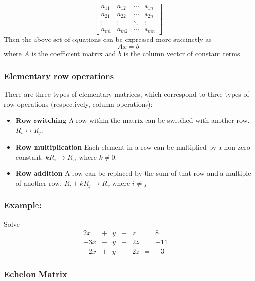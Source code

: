 \documentclass[11pt]{article}
\providecommand{\tightlist}{%
      \setlength{\itemsep}{0pt}\setlength{\parskip}{0pt}}
\begin{document}
\[
\begin{bmatrix}
a_{11} & a_{12} & \cdots & a_{1n} \\
a_{21} & a_{22} &\cdots & a_{2n} \\
\vdots & \vdots & \ddots & \vdots \\
a_{m1} & a_{m2} & \cdots & a_{mn} \end{bmatrix}
\] Then the above set of equations can be expressed more succinctly as
\[
{\displaystyle Ax=b}
\] where \(A\) is the coefficient matrix and \(b\) is the column vector
of constant terms.

\hypertarget{elementary-row-operations}{%
\subsubsection{Elementary row
operations}\label{elementary-row-operations}}

There are three types of elementary matrices, which correspond to three
types of row operations (respectively, column operations):

\begin{itemize}
\tightlist
\item
  \textbf{Row switching} A row within the matrix can be switched with
  another row. \(R_i \leftrightarrow R_j\).
\item
  \textbf{Row multiplication} Each element in a row can be multiplied by
  a non-zero constant.
  \(kR_i \rightarrow R_i,\ \mbox{where } k \neq 0\).
\item
  \textbf{Row addition} A row can be replaced by the sum of that row and
  a multiple of another row.
  \(R_i + kR_j \rightarrow R_i, \mbox{where } i \neq j\)
\end{itemize}

\hypertarget{example}{%
\subsubsection{Example:}\label{example}}

Solve \[
{\displaystyle {\begin{alignedat}{4}2x&{}+{}&y&{}-{}&z&{}={}&8&\\-3x&{}-{}&y&{}+{}&2z&{}={}&-11&\\-2x&{}+{}&y&{}+{}&2z&{}={}&-3&\end{alignedat}}}
\]

    \hypertarget{echelon-matrix}{%
\subsubsection{Echelon Matrix}\label{echelon-matrix}}
\end{document}
